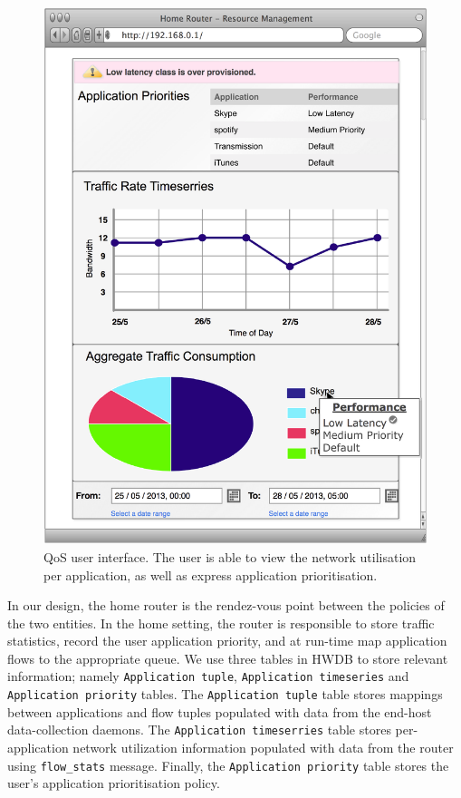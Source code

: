 \begin{figure}
  \centering
  \includegraphics[width=0.8\columnwidth]{homework_intf_qos}
  \caption[QoS user interface]{\label{fig:homework_intf_qos} QoS user interface.
    The user is able to view the network utilisation per application, as well as
    express application prioritisation.}
\end{figure}

In our design, the home router is the rendez-vous point between the policies of the two
entities. In the home setting, the router is responsible to store
traffic statistics, record the user application priority, and at run-time map
application flows to the appropriate queue.  We use three tables in HWDB to
store relevant information; namely \texttt{Application tuple},
\texttt{Application timeseries} and \texttt{Application priority} tables.  The
\texttt{Application tuple} table stores mappings between applications and flow
tuples populated with data from the end-host data-collection daemons.  The
\texttt{Application timeserries} table stores per-application network
utilization information populated with data from the router using \of
\texttt{flow\_stats} message.  Finally, the \texttt{Application priority} table
stores the user's application prioritisation policy. 


